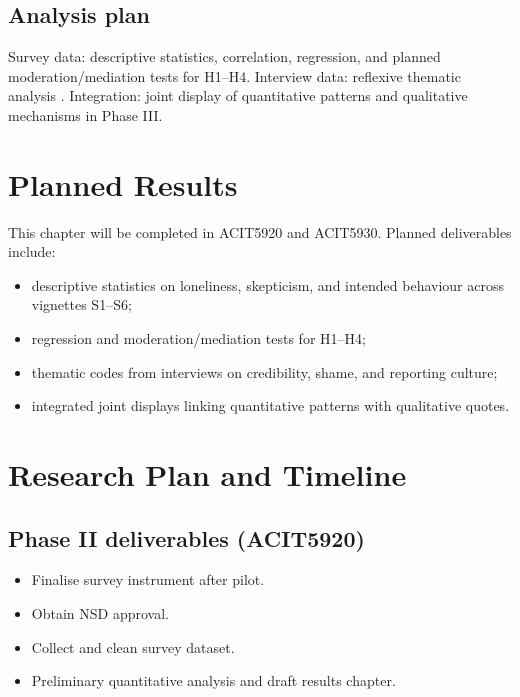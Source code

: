 \documentclass[UKenglish,12pt]{master-style}
\begin{document}
\section{Analysis plan}

Survey data: descriptive statistics, correlation, regression, and planned moderation/mediation tests for H1--H4. Interview data: reflexive thematic analysis \parencite{braun2006thematic}. Integration: joint display of quantitative patterns and qualitative mechanisms in Phase III.

\chapter{Planned Results}
\label{ch:planned-results}

This chapter will be completed in ACIT5920 and ACIT5930. Planned deliverables include:
\begin{itemize}
    \item descriptive statistics on loneliness, skepticism, and intended behaviour across vignettes S1--S6;
    \item regression and moderation/mediation tests for H1--H4;
    \item thematic codes from interviews on credibility, shame, and reporting culture;
    \item integrated joint displays linking quantitative patterns with qualitative quotes.
\end{itemize}

\chapter{Research Plan and Timeline}
\label{ch:planned-analysis}

\section{Phase II deliverables (ACIT5920)}

\begin{itemize}
    \item Finalise survey instrument after pilot.
    \item Obtain NSD approval.
    \item Collect and clean survey dataset.
    \item Preliminary quantitative analysis and draft results chapter.
\end{itemize}
\end{document}
